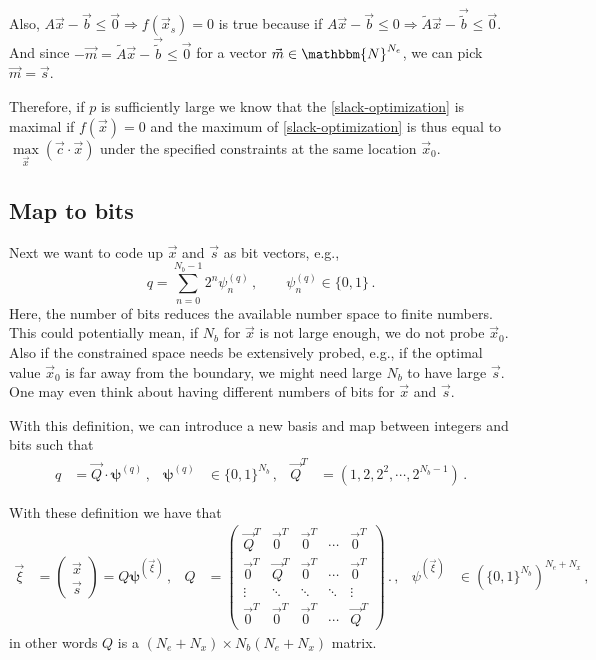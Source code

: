 \documentclass[]{article}
\newcommand{\bvec}[1]{\boldsymbol{#1}}
\newcommand{\assumption}[1]{{\color{red}#1}}
\begin{document}
Also, $A \vec x - \vec{b} \leq \vec 0 \Rightarrow f(\vec x_s) =  0  $ is true because if $A \vec x - \vec b \leq 0 \Rightarrow \tilde A \vec x - \vec{\tilde{b}} \leq \vec 0$.
And since $- \vec m = \tilde A \vec x - \vec{\tilde{b}} \leq \vec 0$ for a vector $\vec m \in \mathbbm{N}^{N_e}$, we can pick $\vec m = \vec s$.

Therefore, if $p$ is sufficiently large we know that the \eqref{slack-optimization} is maximal if $f(\vec x) = 0$ and the maximum of \eqref{slack-optimization} is thus equal to $\max\limits_{\vec x}(\vec c \cdot \vec x)$ under the specified constraints at the same location $\vec x_0$.


\subsection{Map to bits}
Next we want to code up $\vec x$ and $\vec s$ as bit vectors, e.g.,
\begin{equation}
	q = \sum_{n=0}^{N_b-1} 2^n \psi_n^{(q)} \, , \qquad \psi_n^{(q)} \in \{ 0, 1\}\, .
\end{equation}
Here, \assumption{the number of bits reduces the available number space to finite numbers}.
This could potentially mean, if $N_b$ for $\vec x$ is not large enough, we do not probe $\vec x _0$.
Also if the constrained space needs be extensively probed, e.g., if the optimal value $\vec x_0$ is far away from the boundary, we might need large $N_b$ to have large $\vec s$.
One may even think about having different numbers of bits for $\vec x$ and $\vec s$.

With this definition, we can introduce a new basis and map between integers and bits such that
\begin{align}
	q &= \vec Q \cdot \bvec{\psi}^{(q)} \, , &
	\bvec{\psi}^{(q)} &\in \{ 0, 1\}^{N_b} \,, &
	\vec Q^T &= \left(1, 2, 2^2, \cdots,  2^{N_b -1} \right) \, .
\end{align}

With these definition we have that
\begin{align}
	\vec \xi 
	&= 
	\begin{pmatrix}
		\vec x \\
		\vec s 
	\end{pmatrix}
	= Q \bvec \psi^{\left( \vec \xi \right)} \, , &
	Q 
	&=
	\begin{pmatrix}
		\vec Q^T & \vec 0^T & \vec 0^T & \cdots & \vec 0^T \\
		\vec 0^T & \vec Q^T & \vec 0^T & \cdots & \vec 0^T \\
		\vdots   & \ddots   & \ddots   & \ddots & \vdots \\
		\vec 0^T & \vec 0^T & \vec 0^T & \cdots & \vec Q^T
	\end{pmatrix}\, .
	\, , & 
	\psi^{\left( \vec \xi \right)} & \in \left(\{0, 1\}^{N_b}\right)^{N_e + N_x} \, ,
\end{align}
in other words $Q$ is a $(N_e + N_x) \times N_b(N_e + N_x)$ matrix.
\end{document}
